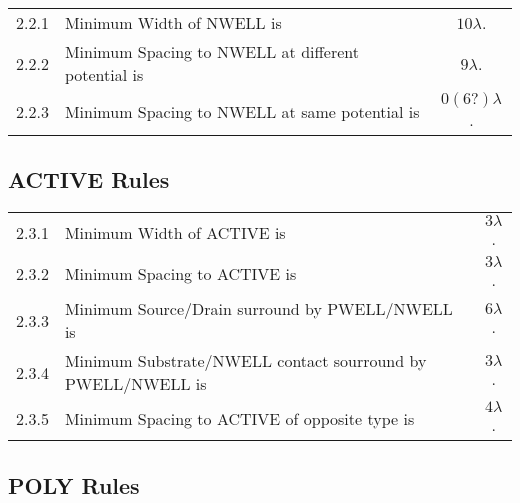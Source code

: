 \begin{center}
\end{center}

\begin{flushleft}
    \begin{tabular}{c l c}
        2.2.1  & Minimum Width of NWELL is & $10 \lambda$. \\
        2.2.2  & Minimum Spacing to NWELL at different potential is & $9 \lambda$. \\
        2.2.3  & Minimum Spacing to NWELL at same potential is & $0 (6?) \lambda$. \\
    \end{tabular}
\end{flushleft}

\subsection{ACTIVE Rules}\label{design_rules_active_rules}

\begin{flushleft}
    \begin{tabular}{c l c}
        2.3.1   & Minimum Width of ACTIVE is & $3 \lambda$. \\
        2.3.2   & Minimum Spacing to ACTIVE is & $3 \lambda$. \\
        2.3.3   & Minimum Source/Drain surround by PWELL/NWELL is & $6 \lambda$. \\
        2.3.4   & Minimum Substrate/NWELL contact sourround by PWELL/NWELL is & $3 \lambda$. \\
        2.3.5   & Minimum Spacing to ACTIVE of opposite type is & $4 \lambda$. \\
    \end{tabular}
\end{flushleft}

\subsection{POLY Rules}\label{design_rules_poly_rules}

